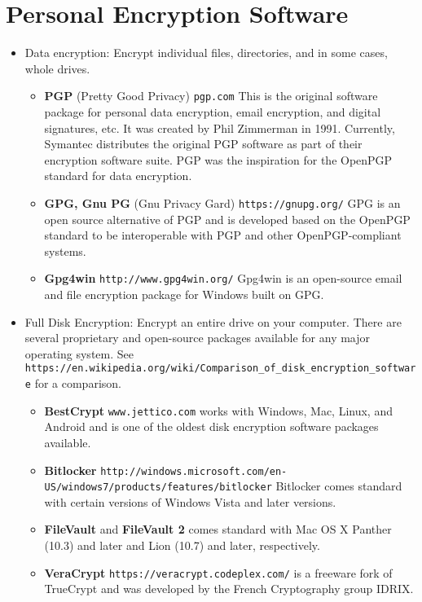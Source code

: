 \chapter{Personal Encryption Software}
\label{ch:personal}

	\begin{itemize}
		\item Data encryption: Encrypt individual files, directories, and in some cases, whole drives.
		\begin{itemize}
			\item {\bf PGP} (Pretty Good Privacy) {\tt pgp.com} This is the original software package for personal data encryption, email encryption, and digital signatures, etc. It was created by Phil Zimmerman in 1991. Currently, Symantec distributes the original PGP software as part of their encryption software suite. PGP was the inspiration for the OpenPGP standard for data encryption.
			\item {\bf GPG, Gnu PG} (Gnu Privacy Gard) {\tt https://gnupg.org/} GPG is an open source alternative of PGP and is developed based on the OpenPGP standard to be interoperable with PGP and other OpenPGP-compliant systems.
			\item {\bf Gpg4win} {\tt http://www.gpg4win.org/} Gpg4win is an open-source email and file encryption package for Windows built on GPG.
		\end{itemize}
		\item Full Disk Encryption: Encrypt an entire drive on your computer. There are several proprietary and open-source packages available for any major operating system. See {\tt https://en.wikipedia.org/wiki/Comparison\_of\_disk\_encryption\_software} for a comparison.
		\begin{itemize}
			\item {\bf BestCrypt} {\tt www.jettico.com} works with Windows, Mac, Linux, and Android and is one of the oldest disk encryption software packages available.
			\item {\bf Bitlocker} {\tt http://windows.microsoft.com/en-US/windows7/products/features/bitlocker} Bitlocker comes standard with certain versions of Windows Vista and later versions.
			\item {\bf FileVault} and {\bf FileVault 2} comes standard with Mac OS X Panther (10.3) and later and Lion (10.7) and later, respectively.
			\item {\bf VeraCrypt} {\tt https://veracrypt.codeplex.com/} is a freeware fork of TrueCrypt and was developed by the French Cryptography group IDRIX.

\end{itemize}
\end{itemize}
